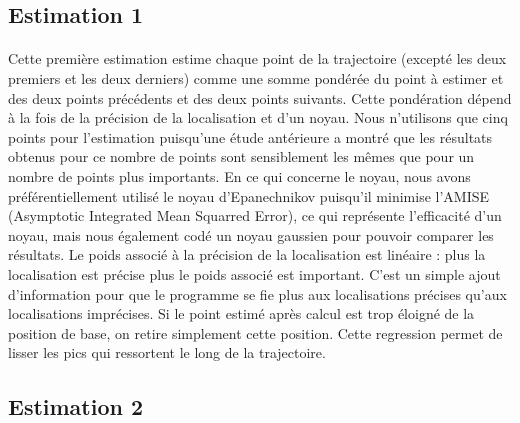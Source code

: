 \documentclass[11p, a4papert]{article}
\begin{document}
\subsection{Estimation 1}
\paragraph{}
Cette première estimation estime chaque point de la trajectoire (excepté les deux premiers et les deux derniers) comme une somme pondérée du point à estimer et des deux points précédents et des deux points suivants. Cette pondération dépend à la fois de la précision de la localisation et d'un noyau. Nous n'utilisons que cinq points pour l'estimation puisqu'une étude antérieure a montré que les résultats obtenus pour ce nombre de points sont sensiblement les mêmes que pour un nombre de points plus importants.
\newline
En ce qui concerne le noyau, nous avons préférentiellement utilisé le noyau d'Epanechnikov puisqu'il minimise l'AMISE (Asymptotic Integrated Mean Squarred Error), ce qui représente l'efficacité d'un noyau, mais nous également codé un noyau gaussien pour pouvoir comparer les résultats.
\newline
Le poids associé à la précision de la localisation est linéaire : plus la localisation est précise plus le poids associé est important. C'est un simple ajout d'information pour que le programme se fie plus aux localisations précises qu'aux localisations imprécises.
\newline
Si le point estimé après calcul est trop éloigné de la position de base, on retire simplement cette position. Cette regression permet de lisser les pics qui ressortent le long de la trajectoire. 

\subsection{Estimation 2}
\end{document}
